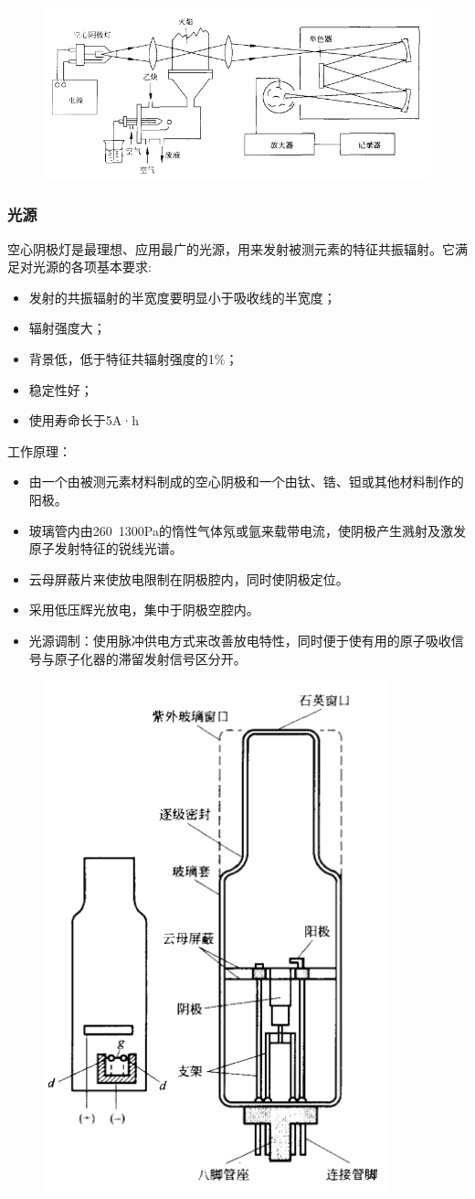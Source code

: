 \begin{figure}[!h]
	\centering
	\includegraphics[width=0.7\linewidth]{image/chp8_instrument}
	\label{fig:chp8instrument}
\end{figure}

\subsubsection{光源}
空心阴极灯是最理想、应用最广的光源，用来发射被测元素的特征共振辐射。它满足对光源的各项基本要求:
\begin{itemize}
	\item 发射的共振辐射的半宽度要明显小于吸收线的半宽度；
	\item 辐射强度大；
	\item 背景低，低于特征共辐射强度的1\%；
	\item 稳定性好；
	\item 使用寿命长于5A·h
\end{itemize}

工作原理：
\begin{itemize}
	\item 由一个由被测元素材料制成的空心阴极和一个由钛、锆、钽或其他材料制作的阳极。
	\item 玻璃管内由260~1300Pa的惰性气体氖或氩来载带电流，使阴极产生溅射及激发原子发射特征的锐线光谱。
	\item 云母屏蔽片来使放电限制在阴极腔内，同时使阴极定位。
	\item 采用低压辉光放电，集中于阴极空腔内。
	\item 光源调制：使用脉冲供电方式来改善放电特性，同时便于使有用的原子吸收信号与原子化器的滞留发射信号区分开。
\end{itemize}

\begin{figure}[!h]
	\centering
	\includegraphics[width=0.4\linewidth]{image/chp8_ICP_lamp}
	\caption{}
	\label{fig:chp8icplamp}
\end{figure}

